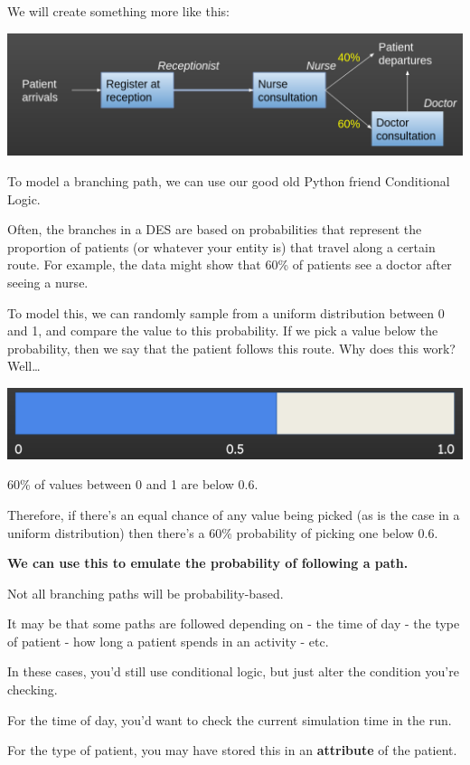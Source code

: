 \documentclass[
  letterpaper,
  DIV=11,
  numbers=noendperiod]{scrreprt}
\begin{document}
We will create something more like this:

\includegraphics{images/example_simple_model_branching.png}

To model a branching path, we can use our good old Python friend
Conditional Logic.

Often, the branches in a DES are based on probabilities that represent
the proportion of patients (or whatever your entity is) that travel
along a certain route. For example, the data might show that 60\% of
patients see a doctor after seeing a nurse.

To model this, we can randomly sample from a uniform distribution
between 0 and 1, and compare the value to this probability. If we pick a
value below the probability, then we say that the patient follows this
route. Why does this work? Well\ldots{}

\includegraphics{images/probability_bar.png}

60\% of values between 0 and 1 are below 0.6.

Therefore, if there's an equal chance of any value being picked (as is
the case in a uniform distribution) then there's a 60\% probability of
picking one below 0.6.

\textbf{We can use this to emulate the probability of following a path.}

\begin{tcolorbox}[enhanced jigsaw, colframe=quarto-callout-note-color-frame, bottomtitle=1mm, breakable, rightrule=.15mm, coltitle=black, colbacktitle=quarto-callout-note-color!10!white, opacityback=0, leftrule=.75mm, arc=.35mm, toptitle=1mm, title=\textcolor{quarto-callout-note-color}{\faInfo}\hspace{0.5em}{Note}, titlerule=0mm, colback=white, toprule=.15mm, bottomrule=.15mm, left=2mm, opacitybacktitle=0.6]

Not all branching paths will be probability-based.

It may be that some paths are followed depending on - the time of day -
the type of patient - how long a patient spends in an activity - etc.

In these cases, you'd still use conditional logic, but just alter the
condition you're checking.

For the time of day, you'd want to check the current simulation time in
the run.

For the type of patient, you may have stored this in an
\textbf{attribute} of the patient.

\end{tcolorbox}
\end{document}
